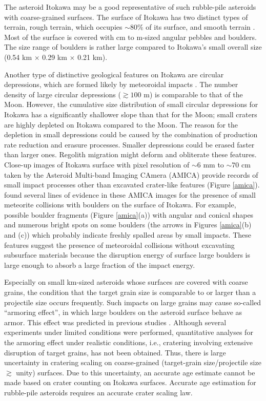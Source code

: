 \documentclass[3p,authoryear]{elsarticle}
\begin{document}
The asteroid Itokawa may be a good representative of such rubble-pile asteroids with coarse-grained surfaces.
The surface of Itokawa has two distinct types of terrain, rough terrain, which occupies $\sim 80\%$ of its surface, and smooth terrain \citep{saito2006}.
Most of the surface is covered with cm to m-sized angular pebbles and boulders. The size range of boulders is rather large compared to Itokawa's small overall size (0.54 km $\times$ 0.29 km $\times$ 0.21 km).

Another type of distinctive geological features on Itokawa are circular depressions, which are formed likely by meteoroidal impacts \citep{hirata2009}.
The number density of large circular depressions ($\gtrsim 100$ m) is comparable to that of the Moon.
However, the cumulative size distribution of small circular depressions for Itokawa has a significantly shallower slope than that for the Moon;
small craters are highly depleted on Itokawa compared to the Moon.
The reason for the depletion in small depressions could be caused by the combination of production rate reduction and erasure processes.
Smaller depressions could be erased faster than larger ones. Regolith migration \citep{miyamoto2007, tancredi2015} might deform and obliterate these features.
Close-up images of Itokawa surface with pixel resolution of $\sim 6$ mm to $\sim70$ cm taken by the Asteroid Multi-band Imaging CAmera (AMICA) provide records of small impact processes other than excavated crater-like features (Figure \ref{amica}). \citet{nakamura2008} found several lines of evidence in these AMICA images for the presence of small meteorite collisions with boulders on the surface of Itokawa. For example, possible boulder fragments (Figure \ref{amica}(a)) with angular and conical shapes and numerous bright spots on some boulders (the arrows in Figures \ref{amica}(b) and (c)) which probably indicate freshly spalled areas by small impacts. These features suggest the presence of meteoroidal collisions without excavating subsurface materials because the disruption energy of surface large boulders is large enough to absorb a large fraction of the impact energy.

Especially on small km-sized asteroids whose surfaces are covered with coarse grains, the condition that the target grain size is comparable to or larger than a projectile size occurs frequently. Such impacts on large grains may cause so-called ``armoring effect'', in which large boulders on the asteroid surface behave as armor. This effect was predicted in previous studies \citep[e.g.,][]{barnouin2005, guettler2012}. Although several experiments under limited conditions were performed, quantitative analyses for the armoring effect under realistic conditions, i.e., cratering involving extensive disruption of target grains, has not been obtained. Thus, there is large uncertainty in cratering scaling on coarse-grained (target-grain size/projectile size $\gtrsim $ unity) surfaces. Due to this uncertainty, an accurate age estimate cannot be made based on crater counting on Itokawa surfaces. Accurate age estimation for rubble-pile asteroids requires an accurate crater scaling law.
\end{document}
